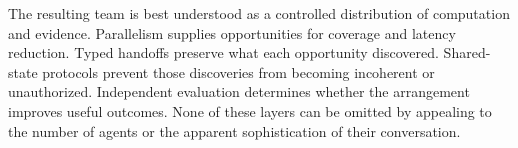The resulting team is best understood as a controlled distribution of computation and evidence. Parallelism supplies opportunities for coverage and latency reduction. Typed handoffs preserve what each opportunity discovered. Shared-state protocols prevent those discoveries from becoming incoherent or unauthorized. Independent evaluation determines whether the arrangement improves useful outcomes. None of these layers can be omitted by appealing to the number of agents or the apparent sophistication of their conversation.
